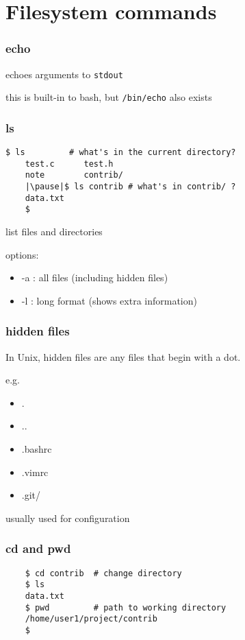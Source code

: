 \documentclass[%
        hyperref={%
                pdfauthor={Zakariyya Mughal},%
                pdfpagemode={None},pdfpagelayout={SinglePage}}%
        xcolor={x11names},%
]{beamer}
\begin{document}
\section{Filesystem commands}\frame{\insertsection}
\begin{frame}[fragile]
	\frametitle{echo}
	
	echoes arguments to \texttt{stdout}

	this is built-in to bash, but \texttt{/bin/echo} also exists
\end{frame}
\begin{frame}[fragile]
	\frametitle{ls}
	\begin{lstlisting}[escapeinside=||]
	$ ls         # what's in the current directory?
	test.c      test.h
	note        contrib/
	|\pause|$ ls contrib # what's in contrib/ ?
	data.txt
	$
	\end{lstlisting}
	\pause
	list files and directories

	options:
	\begin{itemize}
		\item -a : all files (including hidden files)
		\item -l : long format (shows extra information)
	\end{itemize}
\end{frame}
\begin{frame}
	\frametitle{hidden files}
	In Unix, hidden files are any files that begin with a dot.

	e.g.
	\begin{itemize}
		\item .
		\item ..
		\item .bashrc
		\item .vimrc
		\item .git/
	\end{itemize}

	usually used for configuration
\end{frame}
\begin{frame}[fragile]
	\frametitle{cd and pwd}
	\begin{lstlisting}
	$ cd contrib  # change directory
	$ ls
	data.txt
	$ pwd         # path to working directory
	/home/user1/project/contrib
	$
	\end{lstlisting}
\end{frame}
\end{document}
